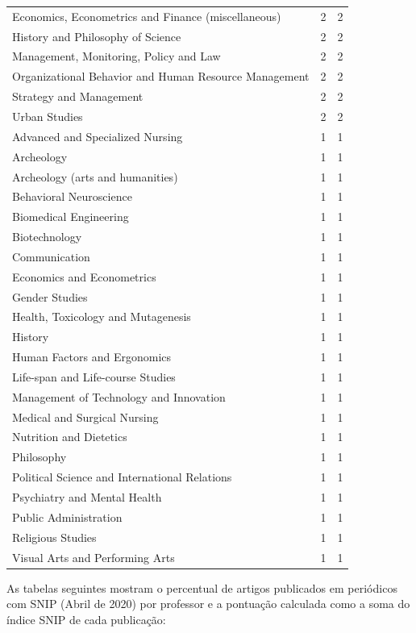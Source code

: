 \documentclass[12pt,brazil]{article}\usepackage[]{graphicx}\usepackage[]{xcolor}
\newcounter{tabela}
\begin{document}
\begin{longtable}{lrr}
Economics, Econometrics and Finance (miscellaneous) & 2 & 2 \\
History and Philosophy of Science & 2 & 2 \\
Management, Monitoring, Policy and Law & 2 & 2 \\
Organizational Behavior and Human Resource Management & 2 & 2 \\
Strategy and Management & 2 & 2 \\
Urban Studies & 2 & 2 \\
Advanced and Specialized Nursing & 1 & 1 \\
Archeology & 1 & 1 \\
Archeology (arts and humanities) & 1 & 1 \\
Behavioral Neuroscience & 1 & 1 \\
Biomedical Engineering & 1 & 1 \\
Biotechnology & 1 & 1 \\
Communication & 1 & 1 \\
Economics and Econometrics & 1 & 1 \\
Gender Studies & 1 & 1 \\
Health, Toxicology and Mutagenesis & 1 & 1 \\
History & 1 & 1 \\
Human Factors and Ergonomics & 1 & 1 \\
Life-span and Life-course Studies & 1 & 1 \\
Management of Technology and Innovation & 1 & 1 \\
Medical and Surgical Nursing & 1 & 1 \\
Nutrition and Dietetics & 1 & 1 \\
Philosophy & 1 & 1 \\
Political Science and International Relations & 1 & 1 \\
Psychiatry and Mental Health & 1 & 1 \\
Public Administration & 1 & 1 \\
Religious Studies & 1 & 1 \\
Visual Arts and Performing Arts & 1 & 1 \\
\end{longtable}


\clearpage

As tabelas seguintes mostram o percentual de artigos publicados em periódicos
com SNIP (Abril de 2020) por professor e a pontuação
calculada como a soma do índice SNIP de cada publicação:
\end{document}
